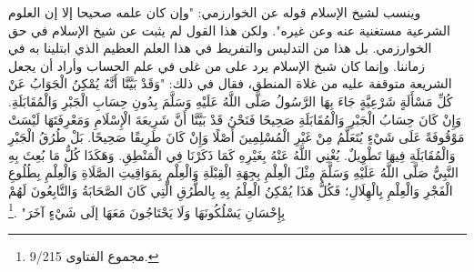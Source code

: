 وينسب لشيخ الإسلام قوله عن الخوارزمي: "وإن كان علمه صحيحا إلا إن العلوم الشرعية مستغنية عنه وعن غيره". ولكن هذا القول لم يثبت عن شيخ الإسلام في حق الخوارزمي. بل هذا من التدليس والتفريط في هذا العلم العظيم الذي ابتلينا به في زماننا. وإنما كان شبخ الإسلام يرد على من غلى في علم الحساب وأراد أن يجعل الشريعة متوقفة عليه من غلاة المنطق، فقال في ذلك: "وَقَدْ بَيَّنَّا أَنَّهُ يُمْكِنُ الْجَوَابُ عَنْ كُلِّ مَسْأَلَةٍ شَرْعِيَّةٍ جَاءَ بِهَا الرَّسُولُ صَلَّى اللَّهُ عَلَيْهِ وَسَلَّمَ بِدُونِ حِسَابِ الْجَبْرِ وَالْمُقَابَلَةِ. وَإِنْ كَانَ حِسَابُ الْجَبْرِ وَالْمُقَابَلَةِ صَحِيحًا فَنَحْنُ قَدْ بَيَّنَّا أَنَّ شَرِيعَةَ الْإِسْلَامِ وَمَعْرِفَتَهَا لَيْسَتْ مَوْقُوفَةً عَلَى شَيْءٍ يُتَعَلَّمُ مِنْ غَيْرِ الْمُسْلِمِينَ أَصْلًا وَإِنْ كَانَ طَرِيقًا صَحِيحًا. بَلْ طُرُقُ الْجَبْرِ وَالْمُقَابَلَةِ فِيهَا تَطْوِيلٌ. يُغْنِي اللَّهُ عَنْهُ بِغَيْرِهِ كَمَا ذَكَرْنَا فِي الْمَنْطِقِ. وَهَكَذَا كُلُّ مَا بُعِثَ بِهِ النَّبِيُّ صَلَّى اللَّهُ عَلَيْهِ وَسَلَّمَ مِثْلَ الْعِلْمِ بِجِهَةِ الْقِبْلَةِ وَالْعِلْمِ بِمَوَاقِيتِ الصَّلَاةِ وَالْعِلْمِ بِطُلُوعِ الْفَجْرِ وَالْعِلْمِ بِالْهِلَالِ؛ فَكُلُّ هَذَا يُمْكِنُ الْعِلْمُ بِهِ بِالطُّرُقِ الَّتِي كَانَ الصَّحَابَةُ وَالتَّابِعُونَ لَهُمْ بِإِحْسَانِ يَسْلُكُونَهَا وَلَا يَحْتَاجُونَ مَعَهَا إلَى شَيْءٍ آخَرَ" \href{https://shamela.ws/book/7289/4480#p1}{\faExternalLink} \cite{ibnTaimia_Majmoo}.\footnote{مجموع الفتاوى 9/215.}

